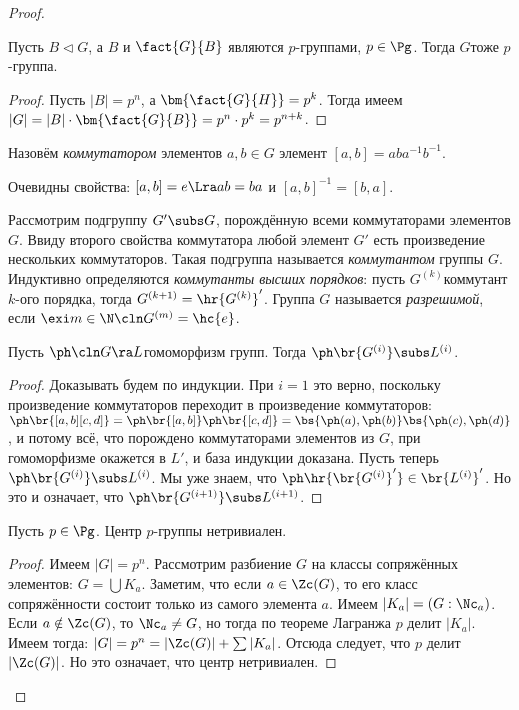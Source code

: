 \documentclass[a4paper]{article}
\begin{document}
\begin{proof}
\begin{theorem}
Пусть $B \lhd G$, а $B$ и $\fact{G}{B}$ являются $p$-группами, $p \in \Pg$.  Тогда $G$\т тоже $p$-группа.
\end{theorem}
\begin{proof}
Пусть $|B| = p^n$, а $\bm{\fact{G}{H}} = p^k$. Тогда имеем  $|G|=|B|\cdot\bm{\fact{G}{B}}=p^n \cdot p^k =
p^{n+k}$.
\end{proof}

\begin{df}
Назовём \emph{коммутатором} элементов $a, b \in G$ элемент  $[a,b]=aba^{-1}b^{-1}$.
\end{df}

Очевидны свойства: $[a,b] = e \Lra ab=ba$ и $[a,b]^{-1}=[b,a]$.

\begin{df}
Рассмотрим подгруппу $G' \subs G$, порождённую всеми коммутаторами
элементов $G$. Ввиду второго свойства коммутатора любой элемент $G'$ есть произведение нескольких
коммутаторов. Такая подгруппа называется \emph{коммутантом} группы $G$. Индуктивно определяются
\emph{коммутанты высших порядков}: пусть $G^{(k)}$\т коммутант $k$-ого порядка, тогда
$G^{(k+1)}=\hr{G^{(k)}}'$. Группа $G$ называется \emph{разрешимой}, если $\exi m \in \N\cln G^{(m)}=\hc{e}$.
\end{df}

\begin{theorem}
Пусть $\ph\cln G \ra L$\т гомоморфизм групп. Тогда $\ph\br{G^{(i)}} \subs L^{(i)}$.
\end{theorem}
\begin{proof}
Доказывать будем по индукции. При $i=1$ это верно, поскольку произведение  коммутаторов переходит в
произведение коммутаторов:
$\ph\br{[a,b][c,d]}=\ph\br{[a,b]}\ph\br{[c,d]}=\bs{\ph(a),\ph(b)}\bs{\ph(c),\ph(d)}$, и потому всё, что
порождено коммутаторами элементов из $G$, при гомоморфизме окажется в $L'$, и база индукции доказана. Пусть
теперь $\ph\br{G^{(i)}} \subs L^{(i)}$. Мы уже знаем, что $\ph\hr{\br{G^{(i)}}'} \in \br{L^{(i)}}'$. Но это и
означает, что $\ph\br{G^{(i+1)}} \subs L^{(i+1)}$.
\end{proof}

\begin{theorem}
Пусть $p \in \Pg$. Центр $p$-группы нетривиален.
\end{theorem}
\begin{proof}
Имеем $|G|=p^n$. Рассмотрим разбиение $G$ на классы сопряжённых элементов:  $G = \bigcup K_a$. Заметим, что
если $a \in \Zc(G)$, то его класс сопряжённости состоит только из самого элемента $a$. Имеем $|K_a| =
(G: \Nc_a)$. Если $a \notin \Zc(G)$, то $\Nc_a \neq G$, но тогда по теореме Лагранжа $p$ делит $|K_a|$. Имеем
тогда: $|G|=p^n=|\Zc(G)|+ \sum |K_a|$. Отсюда следует, что $p$ делит $|\Zc(G)|$. Но это означает, что центр
нетривиален.
\end{proof}


\end{proof}
\end{document}

